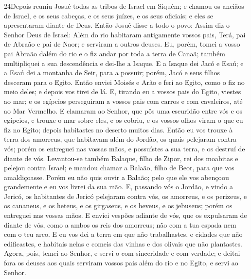 \medskip

\lettrine{24} Depois reuniu Josué todas as tribos de Israel em
Siquém; e chamou os anciãos de Israel, e os seus cabeças, e os seus
juízes, e os seus oficiais; e eles se apresentaram diante de Deus.
Então Josué disse a todo o povo: Assim diz o Senhor Deus de
Israel: Além do rio habitaram antigamente vossos pais, Terá, pai de
Abraão e pai de Naor; e serviram a outros deuses. Eu, porém,
tomei a vosso pai Abraão dalém do rio e o fiz andar por toda a terra
de Canaã; também multipliquei a sua descendência e dei-lhe a Isaque.
E a Isaque dei Jacó e Esaú; e a Esaú dei a montanha de Seir,
para a possuir; porém, Jacó e seus filhos desceram para o Egito.
Então enviei Moisés e Arão e feri ao Egito, como o fiz no meio
deles; e depois vos tirei de lá. E, tirando eu a vossos pais do
Egito, viestes ao mar; e os egípcios perseguiram a vossos pais com
carros e com cavaleiros, até ao Mar Vermelho. E clamaram ao
Senhor, que pôs uma escuridão entre vós e os egípcios, e trouxe o
mar sobre eles, e os cobriu, e os vossos olhos viram o que eu fiz no
Egito; depois habitastes no deserto muitos dias. Então eu vos
trouxe à terra dos amorreus, que habitavam além do Jordão, os quais
pelejaram contra vós; porém os entreguei nas vossas mãos, e
possuístes a sua terra, e os destruí de diante de vós.
Levantou-se também Balaque, filho de Zipor, rei dos moabitas e
pelejou contra Israel; e mandou chamar a Balaão, filho de Beor, para
que vos amaldiçoasse. Porém eu não quis ouvir a Balaão; pelo
que ele vos abençoou grandemente e eu vos livrei da sua mão.
E, passando vós o Jordão, e vindo a Jericó, os habitantes de
Jericó pelejaram contra vós, os amorreus, e os perizeus, e os
cananeus, e os heteus, e os girgaseus, e os heveus, e os jebuseus;
porém os entreguei nas vossas mãos. E enviei vespões adiante
de vós, que os expulsaram de diante de vós, como a ambos os reis dos
amorreus; não com a tua espada nem com o teu arco. E eu vos
dei a terra em que não trabalhastes, e cidades que não edificastes,
e habitais nelas e comeis das vinhas e dos olivais que não
plantastes. Agora, pois, temei ao Senhor, e servi-o com
sinceridade e com verdade; e deitai fora os deuses aos quais
serviram vossos pais além do rio e no Egito, e servi ao Senhor.

